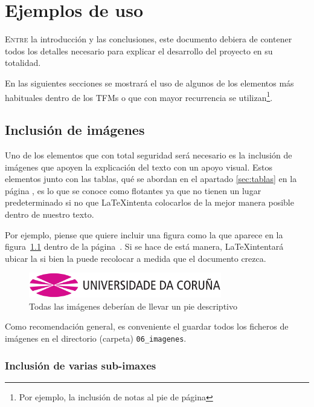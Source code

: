 \chapter{Ejemplos de uso}
\label{chap:demo}

\lettrine{E}{ntre} la introducción y las conclusiones, este documento 
debiera de contener todos los detalles necesario para explicar el 
desarrollo del proyecto en su totalidad. 

En las siguientes secciones se mostrará el uso de algunos de los 
elementos más habituales dentro de los TFMs o que con mayor recurrencia 
se utilizan\footnote{Por ejemplo, la inclusión de notas al pie de página}.


\section{Inclusión de imágenes}\label{sec:incluirImagen}
Uno de los elementos que con total seguridad será necesario es la 
inclusión de imágenes que apoyen la explicación del texto con un apoyo visual.
Estos elementos junto con las tablas, qué se abordan en el apartado
\ref{sec:tablas} en la página \pageref{sec:tablas}, es lo que se conoce como flotantes ya que
no tienen un lugar predeterminado si no que \LaTeX intenta colocarlos de la mejor 
manera posible dentro de nuestro texto.

Por ejemplo, piense que quiere incluir una figura como la que aparece en la 
figura~\ref{fig:ejemplo} dentro de la página~\pageref{fig:ejemplo}. Si se hace 
de está manera, \LaTeX intentará ubicar  la si bien la puede recolocar a medida 
que el documento crezca.

\begin{figure}[hp!] %
  \centering
  \includegraphics[width=0.75\textwidth]{06_imagenes/udc.png}
  \caption{Todas las imágenes deberían de llevar un pie descriptivo}
  \label{fig:ejemplo}
\end{figure}

Como recomendación general, es conveniente el guardar todos los ficheros de 
imágenes en el directorio (carpeta) 
\texttt{06\_imagenes}.

\subsection{Inclusión de varias sub-imaxes}\label{subsec:imagenes}

